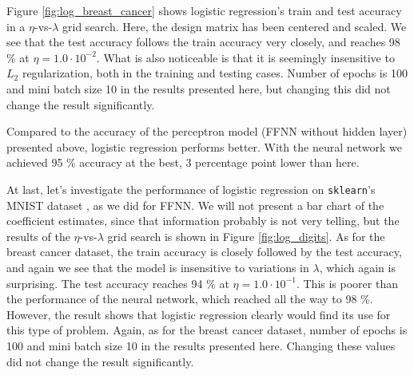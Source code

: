 \documentclass[]{article}
\begin{document}
Figure \ref{fig:log_breast_cancer} shows logistic regression's train and test accuracy in a $\eta$-vs-$\lambda$ grid search. Here, the design matrix has been centered and scaled. We see that the test accuracy follows the train accuracy very closely, and reaches 98 \% at $\eta = 1.0 \cdot 10^{-2}$. What is also noticeable is that it is seemingly insensitive to $L_2$ regularization, both in the training and testing cases. Number of epochs is 100 and mini batch size 10 in the results presented here, but changing this did not change the result significantly. 

Compared to the accuracy of the perceptron model (FFNN without hidden layer) presented above, logistic regression performs better. With the neural network we achieved 95 \% accuracy at the best, 3 percentage point lower than here. 

\vspace{5mm}

At last, let's investigate the performance of logistic regression on \lstinline|sklearn|'s MNIST dataset \cite{skl-datasets}, as we did for FFNN. We will not present a bar chart of the coefficient estimates, since that information probably is not very telling, but the results of the $\eta$-vs-$\lambda$ grid search is shown in Figure \ref{fig:log_digits}. As for the breast cancer dataset, the train accuracy is closely followed by the test accuracy, and again we see that the model is insensitive to variations in $\lambda$, which again is surprising. The test accuracy reaches 94 \% at $\eta = 1.0 \cdot 10^{-1}$. This is poorer than the performance of the neural network, which reached all the way to 98 \%. However, the result shows that logistic regression clearly would find its use for this type of problem. Again, as for the breast cancer dataset, number of epochs is 100 and mini batch size 10 in the results presented here. Changing these values did not change the result significantly. 
\end{document}
